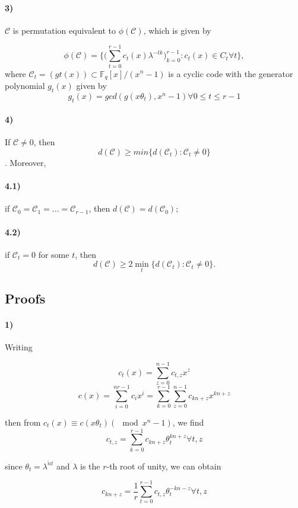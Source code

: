 \documentclass[fontsize=12pt]{article}
\begin{document}
\paragraph{3)} $\mathcal{C}$ is permutation equivalent to $\phi(\mathcal{C})$, which is given by

$$ \phi(\mathcal{C}) = \Bigg \{ \Big ( \sum_{t=0}^{r-1} c_t(x)\lambda^{-tk}\Big)_{k=0}^{r-1} : c_t(x) \in C_t \forall t \Bigg \}, $$
where $\mathcal{C}_t = (gt (x)) \subset \mathbb{F}_q [x]/(x^n - 1)$ is a cyclic code
with the generator polynomial $g_t (x)$ given by
$$g_t (x) = gcd(g(x\theta_t ), x^n -1) \forall 0 \leq t \leq r-1 $$

\paragraph{4)} If $\mathcal{C} \neq 0$, then
$$d(\mathcal{C}) \geq min
\{d(\mathcal{C}_t ) : \mathcal{C}_t \neq 0\}$$.
Moreover,
\paragraph{4.1) }if $\mathcal{C}_0 = \mathcal{C}_1 = ... = \mathcal{C}_{r-1}$, then $d(\mathcal{C}) = d(\mathcal{C}_0)$;
\paragraph{4.2)} if $\mathcal{C}_t = 0$ for some $t$, then
$$d(\mathcal{C}) \geq 2 \min_t
\{d(\mathcal{C}_t ) : \mathcal{C}_t 
\neq 0\}.$$

\subsection{Proofs}

\paragraph{1)}
Writing 

$$  c_t(x) =\sum_{z=0}^{n-1} c_{t,z} x^z  $$
$$  c(x) = \sum_{i=0}^{nr-1}c_ix^i = \sum_{k=0}^{r-1} \sum_{z=0}^{n-1} c_{kn+z} x^{kn+z}  $$

then from $c_t (x) \equiv c(x\theta_t) (\mod x^n - 1)$, we find
$$   c_{t,z} = \sum_{k=0}^{r-1}  c_{kn+z} \theta_t^{kn+z} \forall t,z$$

since $\theta_t = \lambda^{\tilde nt}$ and $\lambda$ is the $r$-th root of unity, we can obtain

$$  c_{kn+z} = \frac{1}{r} \sum_{t=0}^{r-1} c_{t,z} \theta_t^{-kn-z}  \forall t,z $$
\end{document}
